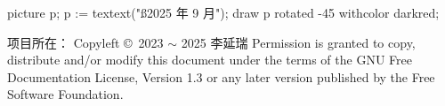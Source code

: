 picture p; p := textext("{\ss 2025 年 9 月}");
draw p rotated -45 withcolor darkred;
\stopuniqueMPgraphic
{}
\setupbackgrounds[page][background=timestamp]

\blank[line]
项目所在：{\tta{}}
\vfill
Copyleft \copyright\  2023 $\sim$ 2025  李延瑞
\blank
Permission is granted to copy, distribute and/or modify this document under the terms of the GNU Free Documentation License, Version 1.3 or any later version published by the Free Software Foundation.
\stopstandardmakeup
\setupbackgrounds[page][background=]
